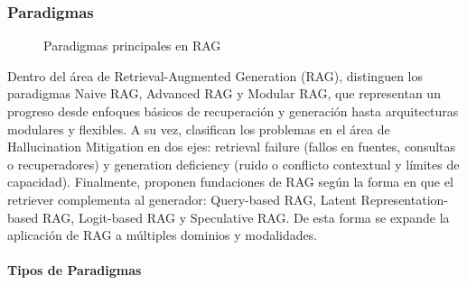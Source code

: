 \subsubsection{Paradigmas}
\begin{figure}[H]
\begin{center}
\end{center}
\caption{Paradigmas principales en RAG}
\label{fig:paradigmas}
\end{figure}

Dentro del área de Retrieval-Augmented Generation (RAG), \textcite{gao2023rag} distinguen los paradigmas Naive RAG, Advanced RAG y Modular RAG, que representan un progreso
desde enfoques básicos de recuperación y generación hasta arquitecturas modulares y flexibles. A su vez, \textcite{zhang2025hallucination} clasifican los problemas en el área de 
Hallucination Mitigation en dos ejes: retrieval failure (fallos en fuentes, consultas o recuperadores) y generation deficiency 
(ruido o conflicto contextual y límites de capacidad). Finalmente, 
\textcite{zhao2024rag} proponen fundaciones de RAG según la forma en que el retriever complementa al generador: Query-based RAG, Latent Representation-based RAG,
Logit-based RAG y Speculative RAG. De esta forma se expande la aplicación de RAG a múltiples dominios y modalidades.



\paragraph{Tipos de Paradigmas}

